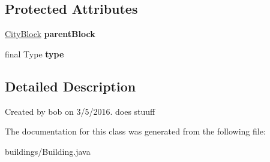 \subsection*{Protected Attributes}
\begin{DoxyCompactItemize}
\item 
\hyperlink{classcities_1_1_city_block}{City\+Block} {\bfseries parent\+Block}\hypertarget{classbuildings_1_1_building_a4fb23e7d146650c7ea733c4c6f5eac2b}{}\label{classbuildings_1_1_building_a4fb23e7d146650c7ea733c4c6f5eac2b}

\item 
final Type {\bfseries type}\hypertarget{classbuildings_1_1_building_a5f6af8b1958c9f5db253a9f9e3b402d3}{}\label{classbuildings_1_1_building_a5f6af8b1958c9f5db253a9f9e3b402d3}

\end{DoxyCompactItemize}


\subsection{Detailed Description}
Created by bob on 3/5/2016. does stuuff 

The documentation for this class was generated from the following file\+:\begin{DoxyCompactItemize}
\item 
buildings/Building.\+java\end{DoxyCompactItemize}
